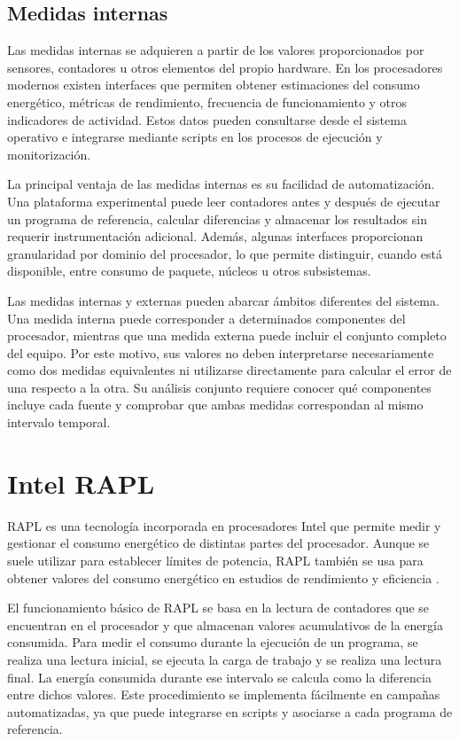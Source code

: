 \subsection{Medidas internas}

Las medidas internas se adquieren a partir de los valores proporcionados por sensores, contadores u otros elementos del propio hardware. En los procesadores modernos existen interfaces que permiten obtener estimaciones del consumo energético, métricas de rendimiento, frecuencia de funcionamiento y otros indicadores de actividad. Estos datos pueden consultarse desde el sistema operativo e integrarse mediante scripts en los procesos de ejecución y monitorización. 

La principal ventaja de las medidas internas es su facilidad de automatización. Una plataforma experimental puede leer contadores antes y después de ejecutar un programa de referencia, calcular diferencias y almacenar los resultados sin requerir instrumentación adicional. Además, algunas interfaces proporcionan granularidad por dominio del procesador, lo que permite distinguir, cuando está disponible, entre consumo de paquete, núcleos u otros subsistemas.

Las medidas internas y externas pueden abarcar ámbitos diferentes del sistema. Una medida interna puede corresponder a determinados componentes del procesador, mientras que una medida externa puede incluir el conjunto completo del equipo. Por este motivo, sus valores no deben interpretarse necesariamente como dos medidas equivalentes ni utilizarse directamente para calcular el error de una respecto a la otra. Su análisis conjunto requiere conocer qué componentes incluye cada fuente y comprobar que ambas medidas correspondan al mismo intervalo temporal.

\section{Intel RAPL}

RAPL es una tecnología incorporada en procesadores Intel que permite medir y gestionar el consumo energético de distintas partes del procesador. Aunque se suele utilizar para establecer límites de potencia, RAPL también se usa para obtener valores del consumo energético en estudios de rendimiento y eficiencia \parencite{khan2018Rapl}.

El funcionamiento básico de RAPL se basa en la lectura de contadores que se encuentran en el procesador y que almacenan valores acumulativos de la energía consumida. Para medir el consumo durante la ejecución de un programa, se realiza una lectura inicial, se ejecuta la carga de trabajo y se realiza una lectura final.  La energía consumida durante ese intervalo se calcula como la diferencia entre dichos valores. Este procedimiento se implementa fácilmente en campañas automatizadas, ya que puede integrarse en scripts y asociarse a cada programa de referencia.

